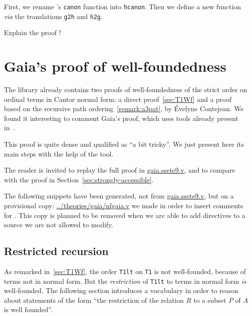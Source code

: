First, we rename \Hydras's \texttt{canon} function into
\texttt{hcanon}. Then we define a new function \emph{via} the
translations \texttt{g2h} and \texttt{h2g}.


\begin{todo}
Explain the proof !
\end{todo}



\section{Gaia's proof of well-foundedness}
The library \Hydras already contains two proofs
of well-foundedness of the strict order on ordinal terms in
Cantor normal form: a direct proof~\vref{sec:T1Wf} and a proof based on the recursive path ordering~\vref{remark:a3pat}, by
\'Evelyne Contejean. We found it interesting to comment Gaia's proof, which uses tools already present in~\cite{CantorContrib}.



This proof is quite dense and qualified as ``a bit tricky''. We just present here its main steps with the help of the \alectr tool.

The reader is invited to replay the full proof in  \href{https://github.com/coq-community/gaia/blob/master/theories/ssete9.v}{gaia.ssete9.v}, and to compare with
the proof in Section~\ref{sec:strongly-accessible}.

\begin{remark}
  The following snippets have been generated, not from
  \href{https://github.com/coq-community/gaia/blob/master/theories/ssete9.v}{gaia.ssete9.v}, but on a provisional copy:
\url{../theories/gaia/nfgaia.v} we made in order to insert comments for \alectr.  This copy is planned to be removed when we are able to add \alectr directives to a \coq source we are not allowed to modify.
\end{remark}

\subsection{Restricted recursion}
As remarked in~\vref{sec:T1Wf}, the order \texttt{T1lt} on \texttt{T1} is not well-founded, because of terms not in normal form.
But the \emph{restriction} of \texttt{T1lt} to terms in normal form \emph{is} well-founded. The following section introduces a  vocabulary in order to reason about statements of the form  ``the restriction of the relation $R$ to a subset $P$ of $A$ is well founded''.




